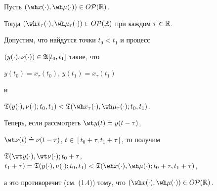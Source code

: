 \begin{lems}


Пусть $(\wh x(\cdot),\wh\mu(\cdot))\in O\cal P(\Bbb R)$.


Тогда $(\wh x_{\tau}(\cdot),


\wh\mu_{\tau}(\cdot))\in O\cal P(\Bbb R)$ при каждом $\tau\in\Bbb R$.


\end{lems}








\begin{pf}


Допустим, что найдутся точки $t_0<t_1$ и процесс


$(y(\cdot),\nu(\cdot))\in\frak A[t_0,t_1]$ такие, что


$y(t_0)=x_{\tau}(t_0)$, $y(t_1)=x_{\tau}(t_1)$


и


$\frak T(y(\cdot),\nu(\cdot);t_0,t_1)<


\frak T(\wh x_{\tau}(\cdot),\wh\mu_{\tau}(\cdot);t_0,t_1)$.


Теперь, если рассмотреть $\wt y(t)\doteq y(t-\tau)$,


$\wt \nu(t)\doteq\nu(t-\tau)$, $t\in[t_0+\tau,t_1+\tau]$, то получим


$\frak T(\wt y(\cdot),\wt\nu(\cdot);t_0+\tau$, $t_1+\tau)=




\frak T(y(\cdot),\nu(\cdot);t_0,t_1)


<\frak T(\wh x(\cdot),\wh\mu(\cdot);t_0+\tau,t_1+\tau)$,


а это противоречит (см. (1.4)) тому, что $(\wh x(\cdot),\wh\mu(\cdot))


\in O\cal P(\Bbb R)$.


\end{pf}





\addtocounter{section}{1}


\setcounter{equation}{0}


\setcounter{lems}{0}


\setcounter{defns}{0}


\setcounter{notes}{0}


\setcounter{thms}{0}


\setcounter{cors}{0}


\setcounter{exams}{0}





